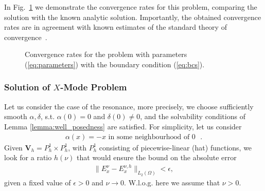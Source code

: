 In Fig.~\ref{fig:conv_rate} we demonstrate the convergence rates for this problem, comparing the solution with the 
known analytic solution. Importantly, the obtained convergence rates are in agreement with known estimates of the standard theory of convergence~\cite{brenner}.
\begin{figure}
    \caption{Convergence rates for the problem with parameters (\ref{eq:parameters}) with the boundary condition (\ref{eq:bcs}).}
    \label{fig:conv_rate}
\end{figure}
\subsubsection{Solution of $X$-Mode Problem}
Let us consider the case of the resonance, more precisely, we choose sufficiently smooth
$\alpha,\delta$, s.t. $\alpha(0)=0$ and $\delta(0)\neq 0$, and the solvability conditions 
of Lemma \ref{lemma:well_posedness}  are satisfied. 
For simplicity, let us consider 
\begin{align}
\label{eq:cond}
 \alpha(x)=-x \text{  in some neighbourhood of $0$ }.
\end{align}
Given $\mathbf{V}_{h}=P_{h}^{1}\times P_{h}^{1}$, with $P_{h}^{1}$ consisting of piecewise-linear (hat) functions, 
we look for a ratio $h(\nu)$ that would ensure the bound on the absolute error 
\begin{align}
\label{eq:problem1}
\|E^{\nu}_{x}-E^{\nu,h}_{x}\|_{L_{2}(\Omega)}<\epsilon,
\end{align}
given a fixed value of $\epsilon>0$ and $\nu\rightarrow 0$. W.l.o.g. here we assume that $\nu>0$. 

